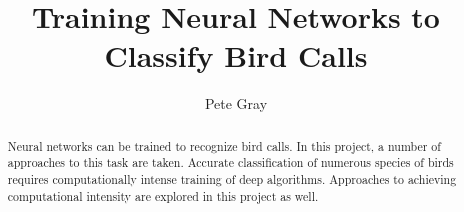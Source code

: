 \documentclass[sigconf]{acmart}
\begin{document}
\title{Training Neural Networks to Classify Bird Calls}

\author{Pete Gray}

\renewcommand{\shortauthors}{Gray}

\begin{abstract}
  Neural networks can be trained to recognize bird calls. In this project,
  a number of approaches to this task are taken. Accurate classification of
  numerous species of birds requires computationally intense training of
  deep algorithms. Approaches to achieving computational 
  intensity are explored in this project as well.
\end{abstract}
\end{document}
